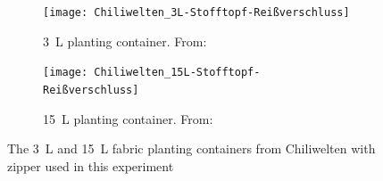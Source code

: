 \begin{figure}[htbp]
    \begin{subfigure}[t]{.48\textwidth}
        \texttt{[image: Chiliwelten\_3L-Stofftopf-Reißverschluss]}
        \caption{\qty[mode=text]{3}{\L} planting container. From: }
        \label{fig:planting-container-3L}
    \end{subfigure}
    \begin{subfigure}[t]{.48\textwidth}
        \texttt{[image: Chiliwelten\_15L-Stofftopf-Reißverschluss]}
        \caption{\qty[mode=text]{15}{\L} planting container. From: }
        \label{fig:planting-container-15L}
    \end{subfigure}
    \caption[Planting containers used in this experiment]{The \qty[mode=text]{3}{\L} and \qty[mode=text]{15}{\L} fabric planting containers from Chiliwelten with zipper used in this experiment}
    \label{fig:planting-containers}
\end{figure}

